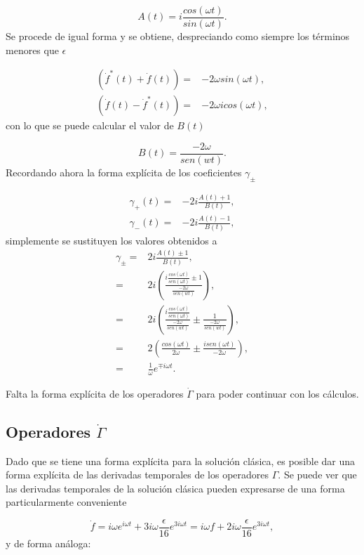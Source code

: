 \documentclass[a4paper,10pt]{report}
\begin{document}
\begin{equation}
A(t) = i \frac{cos(\omega t)}{sin(\omega t)}.
\end{equation} Se procede de igual forma y se obtiene, despreciando como siempre los términos menores que $\epsilon$

\begin{align*}
(\dot{f}^* (t) + \dot{f}(t))=&-2\omega sin(\omega t),\\
(\dot{f} (t) - \dot{f}^*(t))=&-2\omega i cos(\omega t),
\end{align*} con lo que se puede calcular el valor de $B(t)$

\begin{equation}
B(t) = \frac{-2\omega }{sen(wt)}.
\end{equation} Recordando ahora la forma explícita de los coeficientes $\gamma_{\pm}$

\begin{align*}
\gamma_+(t)=&-2i\frac{A(t) +1}{B(t)},\\
\gamma_-(t)=&-2i\frac{A(t) -1}{B(t)},
\end{align*} simplemente se sustituyen los valores obtenidos
a
\begin{align}
\gamma_\pm =& 2i\frac{A(t) \pm 1}{B(t)},\\
=& 2i(\frac{i \frac{cos(\omega t)}{sen(\omega t)}\pm 1}{\frac{-2\omega }{sen(wt)}}), \\
=& 2i(\frac{i \frac{cos(\omega t)}{sen(\omega t)}}{\frac{-2\omega }{sen(wt)}} \pm \frac{1}{\frac{-2\omega }{sen(wt)}}), \\
=& 2(\frac{cos(\omega t)}{2\omega} \pm \frac{i sen(\omega t)}{-2\omega}),\\
=& \frac{1}{\omega}e^{\mp i\omega t}.
\end{align}

Falta la forma explícita de los operadores $\dot{\Gamma}$ para poder continuar con los cálculos.

\subsection{Operadores $\dot{\Gamma}$}

Dado que se tiene una forma explícita para la solución clásica, es posible dar una forma explícita de las derivadas temporales de los operadores $\Gamma$. Se puede ver que las derivadas temporales de la solución clásica pueden expresarse de una forma particularmente conveniente

\begin{equation}
\dot{f} = i\omega e^{i \omega t} + 3i\omega\frac{\epsilon}{16} e^{3i\omega t}= i\omega f + 2i\omega \frac{\epsilon}{16} e^{3i\omega t},
\end{equation} y de forma análoga:
\end{document}
